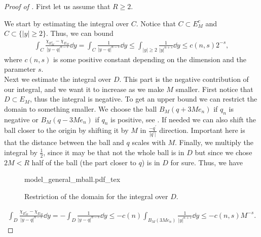 \begin{proof}[Proof of ]
	First let us assume that \( R \geq 2 \).

	We start by estimating the integral over \( C \). Notice that \( C \subset E_M^c \) and \( C
	\subset \{\lvert y \rvert \geq 2 \} \). Thus, we can bound
	\begin{align*}
		\int_C \frac{\chi_{E_M^c} - \chi_{E_M}}{\lvert y - q \rvert^{n - s}} \dd{y}
		= \int_C \frac{1}{\lvert y - q \rvert^{n - s}} \dd{y}
		\leq \int_{\lvert y \rvert \geq 2} \frac{1}{\lvert y \rvert^{n + s}} \dd{y}
		\leq c(n, s) 2^{- s},
	\end{align*}
	where \( c(n, s) \) is some positive constant depending on the dimension and the parameter \( s
	\). \\

	Next we estimate the integral over \( D \). This part is the negative contribution of our integral, and we
	want it to increase as we make \( M \) smaller. First notice that \( D \subset E_M \), thus the
	integral is negative. To get an upper bound we can restrict the domain to something smaller. We
	choose the ball \( B_M (q + 3Me_n) \) if \( q_n \) is negative or \( B_M (q - 3Me_n) \) if \( q_n
	\) is positive, see . If needed we can also shift the ball closer to the origin by
	shifting it by \( M \) in \( \frac{-q^\prime}{\lvert q^\prime \rvert} \) direction. Important here
	is that the distance between the ball and \( q \) scales with \( M \). Finally, we multiply
	the integral by \( \frac{1}{2} \), since it may be that not the whole ball is in \( D \) but since
	we chose \( 2M < R \) half of the ball (the part closer to \( q \)) is in \( D \) for sure. Thus,
	we have

	\begin{figure}[ht]
		\centering
		\def\svgscale{1}
		{model_general_mball.pdf_tex}
		\caption{Restriction of the domain for the integral over \( D \).}
		\label{fig:104}
	\end{figure}

	\begin{align*}
		\int_D \frac{\chi_{E_M^c} - \chi_{E_M}}{\lvert y - q \rvert^{n - s}} \dd{y}
		= - \int_D \frac{1}{\lvert y - q \rvert^{n - s}} \dd{y}
		\leq - c(n) \int_{B_M (3Me_n)} \frac{1}{\lvert y \rvert^{n + s}} \dd{y}
		\leq - c(n, s) M^{- s}.
	\end{align*}


\end{proof}
